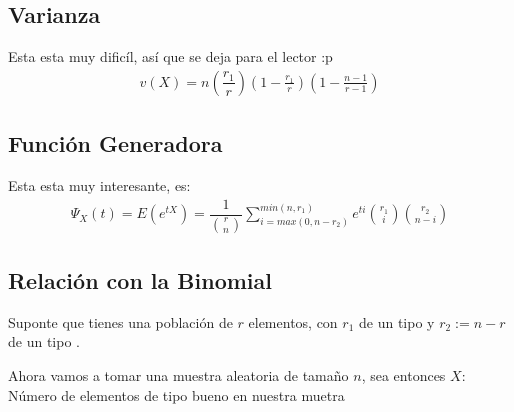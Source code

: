 \documentclass[12pt, fleqn]{report}                             %
\newcommand \Quote              {\qq}                           %
\theoremstyle{break}                                            %
\newcommand{\Wrap}[1]           {\left( #1 \right)}             %
\newcommand{\pfrac}[2]      {\Wrap{\dfrac{#1}{#2}}}             %
\begin{document}
            \subsection{Varianza}

                Esta esta muy dificíl, así que se deja para el lector :p
                \begin{align*}
                    v(X) = n \pfrac{r_1}{r} \Wrap{1 - \frac{r_1}{r}} \Wrap{1 - \frac{n - 1}{r - 1}}
                \end{align*}
                    

                

            \clearpage
            \subsection{Función Generadora}

                Esta esta muy interesante, es:
                \begin{align*}
                    \Psi_X(t) 
                        = E( e^{tX} )                 
                        = \dfrac{1}{\binom{r}{n}}                      
                            \sum_{i = max (0, n - r_2)}^{min(n, r_1)}               
                               e^{ti} \binom{r_1}{i} \binom{r_2}{n - i}
                \end{align*}


            \clearpage
            \subsection{Relación con la Binomial}

                Suponte que tienes una población de $r$ elementos, con $r_1$ de un tipo \Quote{bueno}
                y $r_2 := n - r$ de un tipo \Quote{malo}.

                Ahora vamos a tomar una muestra aleatoria de tamaño $n$,
                sea entonces $X : $ Número de elementos de tipo bueno en nuestra muetra 
\end{document}
